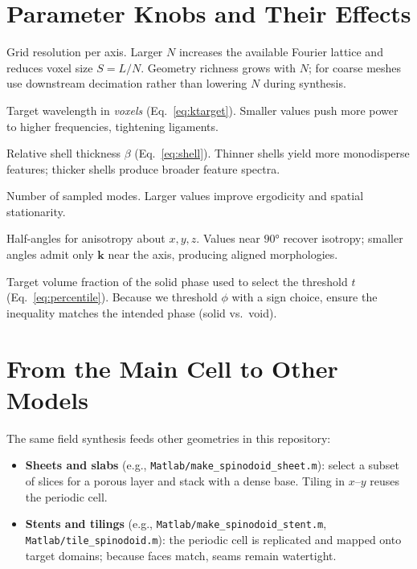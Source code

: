 \documentclass[11pt,a4paper]{article}
\newcommand{\vk}{\bm{k}}
\begin{document}
\section{Parameter Knobs and Their Effects}
\begin{description}[leftmargin=2.3cm,style=nextline]
  \item[\texttt{N}] Grid resolution per axis. Larger $N$ increases the available Fourier lattice and reduces voxel size $S=L/N$. Geometry richness grows with $N$; for coarse meshes use downstream decimation rather than lowering $N$ during synthesis.
  \item[\texttt{lambda\_vox}] Target wavelength in \emph{voxels} (Eq.~\eqref{eq:ktarget}). Smaller values push more power to higher frequencies, tightening ligaments.
  \item[\texttt{bandwidth}] Relative shell thickness $\beta$ (Eq.~\eqref{eq:shell}). Thinner shells yield more monodisperse features; thicker shells produce broader feature spectra.
  \item[\texttt{nModes}] Number of sampled modes. Larger values improve ergodicity and spatial stationarity.
  \item[\texttt{coneDeg}] Half-angles for anisotropy about $x,y,z$. Values near $\ang{90}$ recover isotropy; smaller angles admit only $\vk$ near the axis, producing aligned morphologies.
  \item[\texttt{solid\_frac}] Target volume fraction of the solid phase used to select the threshold $t$ (Eq.~\eqref{eq:percentile}). Because we threshold $\phi$ with a sign choice, ensure the inequality matches the intended phase (solid vs.\ void).
\end{description}

\section{From the Main Cell to Other Models}
The same field synthesis feeds other geometries in this repository:
\begin{itemize}
  \item \textbf{Sheets and slabs} (e.g., \texttt{Matlab/make\_spinodoid\_sheet.m}): select a subset of slices for a porous layer and stack with a dense base. Tiling in $x$--$y$ reuses the periodic cell.
  \item \textbf{Stents and tilings} (e.g., \texttt{Matlab/make\_spinodoid\_stent.m}, \texttt{Matlab/tile\_spinodoid.m}): the periodic cell is replicated and mapped onto target domains; because faces match, seams remain watertight.
\end{itemize}
\end{document}
